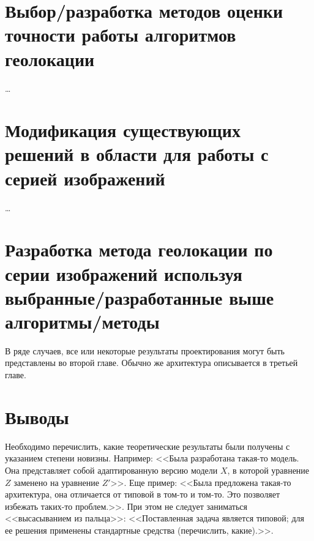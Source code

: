 \section{Выбор/разработка методов оценки точности работы алгоритмов геолокации}

\dots





\section{Модификация существующих решений в области для работы с серией изображений}

\dots





\section{Разработка метода геолокации по серии изображений используя выбранные/разработанные выше алгоритмы/методы}

В ряде случаев, все или некоторые результаты проектирования могут быть представлены во второй главе. Обычно же архитектура описывается в третьей главе.

\section{Выводы}

Необходимо перечислить, какие теоретические результаты были получены с 
указанием степени новизны. Например: <<Была разработана такая-то модель. Она 
представляет собой адаптированную версию модели $X$, в которой уравнение $Z$ 
заменено на уравнение $Z'$>>. Еще пример: <<Была предложена такая-то 
архитектура, она отличается от типовой в том-то и том-то. Это позволяет 
избежать таких-то проблем.>>. При этом не следует заниматься <<высасыванием из 
пальца>>: <<Поставленная задача является типовой; для ее решения применены 
стандартные средства (перечислить, какие).>>.
